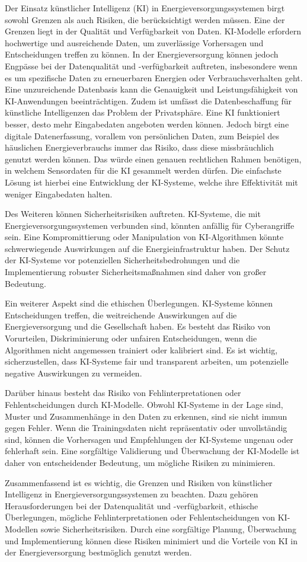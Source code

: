 Der Einsatz künstlicher Intelligenz (KI) in Energieversorgungssystemen birgt
sowohl Grenzen als auch Risiken, die berücksichtigt werden müssen. Eine der
Grenzen liegt in der Qualität und Verfügbarkeit von Daten. KI-Modelle erfordern
hochwertige und ausreichende Daten, um zuverlässige Vorhersagen und
Entscheidungen treffen zu können. In der Energieversorgung können jedoch
Engpässe bei der Datenqualität und -verfügbarkeit auftreten, insbesondere wenn
es um spezifische Daten zu erneuerbaren Energien oder Verbrauchsverhalten geht.
Eine unzureichende Datenbasis kann die Genauigkeit und Leistungsfähigkeit von
KI-Anwendungen beeinträchtigen. Zudem ist umfässt die Datenbeschaffung für
künstliche Intelligenzen das Problem der Privatsphäre. Eine KI funktioniert
besser, desto mehr Eingabedaten angeboten werden können. Jedoch birgt eine
digitale Datenerfassung, vorallem von persönlichen Daten, zum Beispiel des
häuslichen Energieverbrauchs immer das Risiko, dass diese missbräuchlich
genutzt werden können. Das würde einen genauen rechtlichen Rahmen benötigen, in
welchem Sensordaten für die KI gesammelt werden dürfen. Die einfachste Lösung
ist hierbei eine Entwicklung der KI-Systeme, welche ihre Effektivität mit
weniger Eingabedaten halten.\cite{djeffal2020kunstliche}

Des Weiteren können Sicherheitsrisiken auftreten. KI-Systeme, die mit
Energieversorgungssystemen verbunden sind, könnten anfällig für Cyberangriffe
sein. Eine Kompromittierung oder Manipulation von KI-Algorithmen könnte
schwerwiegende Auswirkungen auf die Energieinfrastruktur haben. Der Schutz der
KI-Systeme vor potenziellen Sicherheitsbedrohungen und die Implementierung
robuster Sicherheitsmaßnahmen sind daher von großer Bedeutung.

Ein weiterer Aspekt sind die ethischen Überlegungen. KI-Systeme können
Entscheidungen treffen, die weitreichende Auswirkungen auf die
Energieversorgung und die Gesellschaft haben. Es besteht das Risiko von
Vorurteilen, Diskriminierung oder unfairen Entscheidungen, wenn die Algorithmen
nicht angemessen trainiert oder kalibriert sind. Es ist wichtig,
sicherzustellen, dass KI-Systeme fair und transparent arbeiten, um potenzielle
negative Auswirkungen zu vermeiden.

Darüber hinaus besteht das Risiko von Fehlinterpretationen oder
Fehlentscheidungen durch KI-Modelle. Obwohl KI-Systeme in der Lage sind, Muster
und Zusammenhänge in den Daten zu erkennen, sind sie nicht immun gegen Fehler.
Wenn die Trainingsdaten nicht repräsentativ oder unvollständig sind, können die
Vorhersagen und Empfehlungen der KI-Systeme ungenau oder fehlerhaft sein. Eine
sorgfältige Validierung und Überwachung der KI-Modelle ist daher von
entscheidender Bedeutung, um mögliche Risiken zu minimieren.



Zusammenfassend ist es wichtig, die Grenzen und Risiken von künstlicher
Intelligenz in Energieversorgungssystemen zu beachten. Dazu gehören
Herausforderungen bei der Datenqualität und -verfügbarkeit, ethische
Überlegungen, mögliche Fehlinterpretationen oder Fehlentscheidungen von
KI-Modellen sowie Sicherheitsrisiken. Durch eine sorgfältige Planung,
Überwachung und Implementierung können diese Risiken minimiert und die Vorteile
von KI in der Energieversorgung bestmöglich genutzt werden.